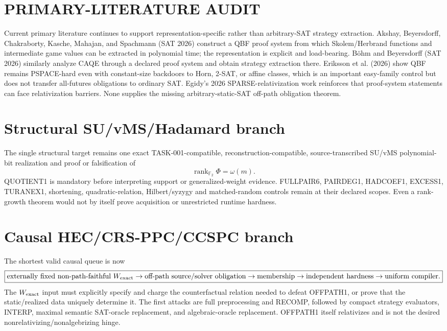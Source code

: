 \documentclass[11pt]{article}
\begin{document}
\section*{PRIMARY-LITERATURE AUDIT}
Current primary literature continues to support representation-specific rather than arbitrary-SAT strategy extraction. Akshay, Beyersdorff, Chakraborty, Kasche, Mahajan, and Spachmann (SAT 2026) construct a QBF proof system from which Skolem/Herbrand functions and intermediate game values can be extracted in polynomial time; the representation is explicit and load-bearing. Böhm and Beyersdorff (SAT 2026) similarly analyze CAQE through a declared proof system and obtain strategy extraction there. Eriksson et al. (2026) show QBF remains PSPACE-hard even with constant-size backdoors to Horn, 2-SAT, or affine classes, which is an important easy-family control but does not transfer all-futures obligations to ordinary SAT. Egidy's 2026 SPARSE-relativization work reinforces that proof-system statements can face relativization barriers. None supplies the missing arbitrary-static-SAT off-path obligation theorem.

\section*{Structural SU/vMS/Hadamard branch}
The single structural target remains one exact TASK-001-compatible, reconstruction-compatible, source-transcribed SU/vMS polynomial-bit realization and proof or falsification of
\[
\boxed{\operatorname{rank}_{\mathbb F_2}\Phi=\omega(m)}.
\]
QUOTIENT1 is mandatory before interpreting support or generalized-weight evidence. FULLPAIR6, PAIRDEG1, HADCOEF1, EXCESS1, TURANEX1, shortening, quadratic-relation, Hilbert/syzygy and matched-random controls remain at their declared scopes. Even a rank-growth theorem would not by itself prove acquisition or unrestricted runtime hardness.

\section*{Causal HEC/CRS-PPC/CCSPC branch}
The shortest valid causal queue is now
\[
\boxed{
\text{externally fixed non-path-faithful }W_{\rm exact}
\to
\text{off-path source/solver obligation}
\to
\text{membership}
\to
\text{independent hardness}
\to
\text{uniform compiler}.}
\]
The \(W_{\rm exact}\) input must explicitly specify and charge the counterfactual relation needed to defeat OFFPATH1, or prove that the static/realized data uniquely determine it. The first attacks are full preprocessing and RECOMP, followed by compact strategy evaluators, INTERP, maximal semantic SAT-oracle replacement, and algebraic-oracle replacement. OFFPATH1 itself relativizes and is not the desired nonrelativizing/nonalgebrizing hinge.
\end{document}
